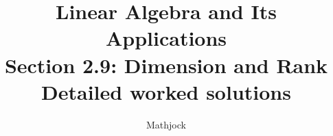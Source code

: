 
\title{\textbf{Linear Algebra and Its Applications}\\[0.3em]Section 2.9: Dimension and Rank\\[0.3em]\large Detailed worked solutions}
\author{Mathjock}
\date{}

\maketitle
\bookinfo
\tableofcontents
\clearpage
\renewcommand{\thesection}{2.\arabic{section}}
\renewcommand{\theHsection}{2.\arabic{section}}
\setcounter{section}{8}


